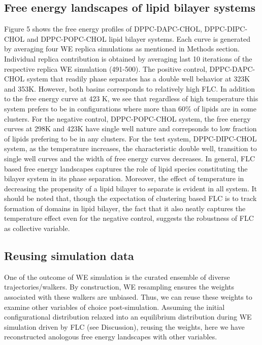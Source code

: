 \documentclass{biophys-new}
\begin{document}
\subsection*{Free energy landscapes of lipid bilayer systems}

Figure 5 shows the free energy profiles of DPPC-DAPC-CHOL, DPPC-DIPC-CHOL and DPPC-POPC-CHOL lipid bilayer systems.
Each curve is generated by averaging four WE replica simulations as mentioned in Methods section.
Individual replica contribution is obtained by averaging last 10 iterations of the respective replica WE simulation (491-500). 
The positive control, DPPC-DAPC-CHOL system that readily phase separates has a double well behavior at 323K and 353K.
However, both basins corresponds to relatively high FLC.
In addition to the free energy curve at 423 K, we see that regardless of high temperature this system prefers to be in configurations where more than 60\% of lipids are in some clusters.
For the negative control, DPPC-POPC-CHOL system, the free energy curves at 298K and 423K have single well nature and correpsonds to low fraction of lipids prefering to be in any clusters.
For the test system, DPPC-DIPC-CHOL system, as the temperature increases, the characteristic double well, transition to single well curves and the width of free energy curves decreases.
In general, FLC based free energy landscapes captures the role of lipid species constituting the bilayer system in its phase separation.
Moreover, the effect of temperature in decreasing the propensity of a lipid bilayer to separate is evident in all system.
It should be noted that, though the expectation of clustering based FLC is to track formation of domains in lipid bilayer, the fact that it also neatly captures the temperature effect even for the negative control, suggests the robustness of FLC as collective variable.

\subsection*{Reusing simulation data}

One of the outcome of WE simulation is the curated ensemble of diverse trajectories/walkers.
By construction, WE resampling ensures the weights associated with these walkers are unbiased.
Thus, we can reuse these weights to examine other variables of choice post-simulation.
Assuming the initial configurational distribution relaxed into an equilibrium distribution during WE simulation driven by FLC (see Discussion), 
reusing the weights, here we have reconstructed anologous free energy landscapes with other variables.
\end{document}
